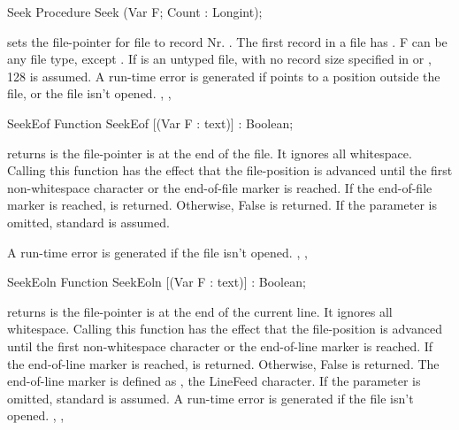 
\begin{procedure}{Seek}
\Declaration
Procedure Seek (Var F; Count : Longint);

\Description
{} sets the file-pointer for file  to record Nr. .
The first record in a file has . F can be any file type, except
. If  is an untyped file, with no record size specified in
 or , 128 is assumed.
\Errors
A run-time error is generated if  points to a position outside
the file, or the file isn't opened.
\SeeAlso
{}, , 
\end{procedure}


\begin{function}{SeekEof}
\Declaration
Function SeekEof [(Var F : text)] : Boolean;

\Description
{} returns  is the file-pointer is at the end of the
file. It ignores all whitespace.
Calling this function has the effect that the file-position is advanced
until the first non-whitespace character or the end-of-file marker is
reached.
If the end-of-file marker is reached,  is returned. Otherwise,
False is returned.
If the parameter  is omitted, standard  is assumed.

\Errors
A run-time error is generated if the file  isn't opened.
\SeeAlso
{}, , 
\end{function}


\begin{function}{SeekEoln}
\Declaration
Function SeekEoln [(Var F : text)] : Boolean;

\Description
{} returns  is the file-pointer is at the end of the
current line. It ignores all whitespace.
Calling this function has the effect that the file-position is advanced
until the first non-whitespace character or the end-of-line marker is
reached.
If the end-of-line marker is reached,  is returned. Otherwise,
False is returned.
The end-of-line marker is defined as , the LineFeed character.
If the parameter  is omitted, standard  is assumed.
\Errors
A run-time error is generated if the file  isn't opened.
\SeeAlso
{}, , 
\end{function}

